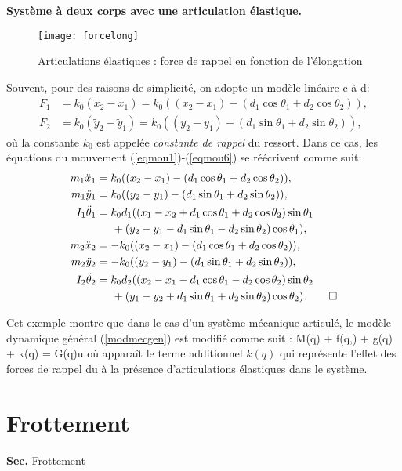 \begin{exemple} {\bf Système à deux corps avec une articulation élastique.}
\begin{figure}[ht]
\begin{center}
\texttt{[image: forcelong]}
\caption{Articulations élastiques : force de rappel en fonction de l'élongation}
\label{Fig:forcelong}
\end{center}
\end{figure}
Souvent, pour des raisons de simplicité, on adopte un modèle linéaire c-à-d:
\begin{align*}
F_1 &= k_0(\tilde x_2 - \tilde x_1) = k_0((x_2 - x_1) - (d_1\cos\theta_1 + d_2\cos\theta_2)), \\
F_2 &= k_0(\tilde y_2 - \tilde y_1) = k_0((y_2 - y_1) - (d_1\sin\theta_1 + d_2\sin\theta_2)),
\end{align*}
où la constante $k_0$ est appelée {\em constante de rappel} du ressort. Dans ce cas, les 
équations du mouvement (\ref{eqmou1})-(\ref{eqmou6}) se réécrivent comme suit:
\begin{align*}
m_1\ddot x_1 &= k_0((x_2 - x_1) - (d_1\cos\theta_1 + d_2\cos\theta_2)), \\
m_1\ddot y_1 &= k_0((y_2 - y_1) - (d_1\sin\theta_1 + d_2\sin\theta_2)), \\
I_1\ddot \theta_1 &= k_0d_1((x_1 - x_2  + d_1\cos\theta_1 + d_2\cos\theta_2)\sin\theta_1 \\
&\hspace{5mm} +  (y_2 -y_1  - d_1\sin\theta_1 - d_2\sin\theta_2)\cos\theta_1), \\
m_2\ddot x_2 &= - k_0((x_2 - x_1) - (d_1\cos\theta_1 + d_2\cos\theta_2)), \\
m_2\ddot y_2 &= - k_0((y_2 - y_1) - (d_1\sin\theta_1 + d_2\sin\theta_2)), \\
I_2\ddot \theta_2 &=  k_0d_2((x_2 - x_1 - d_1\cos\theta_1 - d_2\cos\theta_2)\sin\theta_2 \\
&\hspace{5mm} +  (y_1 -y_2 + d_1\sin\theta_1 + d_2\sin\theta_2)\cos\theta_2). \qed
\end{align*}
\end{exemple}

Cet exemple montre que dans le cas d'un système mécanique articulé, le modèle dynamique 
général (\ref{modmecgen}) est modifié comme suit :
\eqn
M(q) + f(q,) + g(q) + k(q) = G(q)u \label{modgenflex}
\eeqn
où apparaît le terme additionnel $k(q)$ qui représente l'effet des forces de rappel
du à la présence d'articulations élastiques dans le système.

\section{Frottement}
{{ \bf Sec. \thesection }\hfill Frottement\hspace*{5mm}} 

